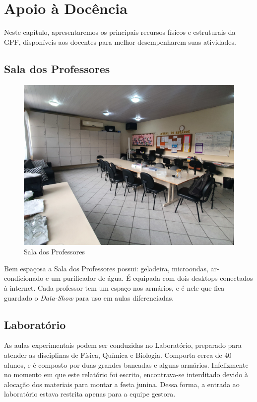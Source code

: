 \chapter{Apoio à Docência}
\label{cap: apoioDocencia}
Neste capítulo, apresentaremos os principais recursos físicos e estruturais da \ac{GPF}, disponíveis aos docentes para melhor desempenharem suas atividades.

\section{Sala dos Professores}
\setlength\intextsep{0pt}
\begin{figure}
    \centering
    \includegraphics[width=.45\textwidth]{03-elementos/03.2_textual/03.2.1_fig/sala-de-profs01.jpg}
    
    \label{fig:salaDosProfs}
    \caption{Sala dos Professores}    
\end{figure}
Bem espaçosa a Sala dos Professores possui: geladeira, microondas, ar-condicionado e um purificador de água. É equipada com dois desktops conectados à internet. Cada professor tem um espaço nos armários, e é nele que fica guardado o \emph{Data-Show} para uso em aulas diferenciadas.

\section{Laboratório}
As aulas experimentais podem ser conduzidas no Laboratório, preparado para atender as disciplinas de Física, Química e Biologia. Comporta cerca de 40 alunos, e é composto por duas grandes bancadas e alguns armários. Infelizmente no momento em que este relatório foi escrito, encontrava-se interditado devido à alocação dos materiais para montar a festa junina. Dessa forma, a entrada ao laboratório estava restrita apenas para a equipe gestora.


